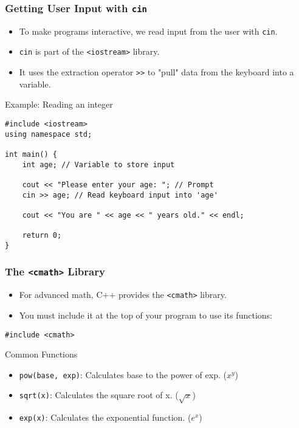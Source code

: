 \documentclass{beamer}
\begin{document}
\begin{frame}[fragile]
\frametitle{Getting User Input with \texttt{cin}}
\begin{itemize}
    \item To make programs interactive, we read input from the user with \texttt{cin}.\pause
    \item \texttt{cin} is part of the \texttt{<iostream>} library.\pause
    \item It uses the extraction operator \texttt{>>} to "pull" data from the keyboard into a variable.
\end{itemize}
\pause
\begin{exampleblock}{Example: Reading an integer}
\begin{verbatim}
#include <iostream>
using namespace std;

int main() {
    int age; // Variable to store input

    cout << "Please enter your age: "; // Prompt
    cin >> age; // Read keyboard input into 'age'

    cout << "You are " << age << " years old." << endl;

    return 0;
}
\end{verbatim}
\end{exampleblock}
\end{frame}

\begin{frame}[fragile]
\frametitle{The \texttt{<cmath>} Library}
\begin{itemize}
    \item For advanced math, C++ provides the \texttt{<cmath>} library.\pause
    \item You must include it at the top of your program to use its functions:
\end{itemize}
\begin{verbatim}
#include <cmath>
\end{verbatim}
\pause
\begin{alertblock}{Common Functions}
    \begin{itemize}
        \item \texttt{pow(base, exp)}: Calculates base to the power of exp. (\(x^y\))\pause
        \item \texttt{sqrt(x)}: Calculates the square root of x. (\(\sqrt{x}\))\pause
        \item \texttt{exp(x)}: Calculates the exponential function. (\(e^x\))
    \end{itemize}
\end{alertblock}
\end{frame}
\end{document}
